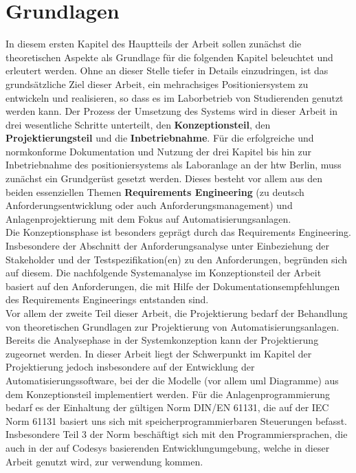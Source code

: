 \documentclass[../../Bachelorarbeit.tex]{subfiles}
\begin{document}
\section{Grundlagen}
In diesem ersten Kapitel des Hauptteils der Arbeit sollen zunächst die theoretischen Aspekte als Grundlage für die folgenden Kapitel beleuchtet und erleutert werden. Ohne an dieser Stelle tiefer in Details einzudringen, ist das grundsätzliche Ziel dieser Arbeit, ein mehrachsiges Positioniersystem zu entwickeln und realisieren, so dass es im Laborbetrieb von Studierenden genutzt werden kann. Der Prozess der Umsetzung des Systems wird in dieser Arbeit in drei wesentliche Schritte unterteilt, den \textbf{Konzeptionsteil}, den \textbf{Projektierungsteil} und die \textbf{Inbetriebnahme}. Für die erfolgreiche und normkonforme Dokumentation und Nutzung der drei Kapitel bis hin zur Inbetriebnahme des positioniersystems als Laboranlage an der \ac{htw} Berlin, muss zunächst ein Grundgerüst gesetzt werden. Dieses besteht vor allem aus den beiden essenziellen Themen \textbf{Requirements Engineering} (zu deutsch Anforderungsentwicklung oder auch Anforderungsmanagement) und Anlagenprojektierung mit dem Fokus auf Automatisierungsanlagen.\\
Die Konzeptionsphase ist besonders geprägt durch das Requirements Engineering. Insbesondere der Abschnitt der Anforderungsanalyse unter Einbeziehung der Stakeholder und der Testspezifikation(en) zu den Anforderungen, begründen sich auf diesem. Die nachfolgende Systemanalyse im Konzeptionsteil der Arbeit basiert auf den Anforderungen, die mit Hilfe der Dokumentationsempfehlungen des Requirements Engineerings entstanden sind.\\
Vor allem der zweite Teil dieser Arbeit, die Projektierung bedarf der Behandlung von theoretischen Grundlagen zur Projektierung von Automatisierungsanlagen. Bereits die Analysephase in der Systemkonzeption kann der Projektierung zugeornet werden. In dieser Arbeit liegt der Schwerpunkt im Kapitel der Projektierung jedoch insbesondere auf der Entwicklung der Automatisierungssoftware, bei der die Modelle (vor allem \acs{uml} Diagramme) aus dem Konzeptionsteil implementiert werden. Für die Anlagenprogrammierung bedarf es der Einhaltung der gültigen Norm DIN/EN 61131, die auf der IEC Norm 61131 basiert uns sich mit speicherprogrammierbaren Steuerungen befasst. Insbesondere Teil 3 der Norm beschäftigt sich mit den Programmiersprachen, die auch in der auf Codesys basierenden Entwicklungumgebung, welche in dieser Arbeit genutzt wird, zur verwendung kommen. \\
\end{document}
